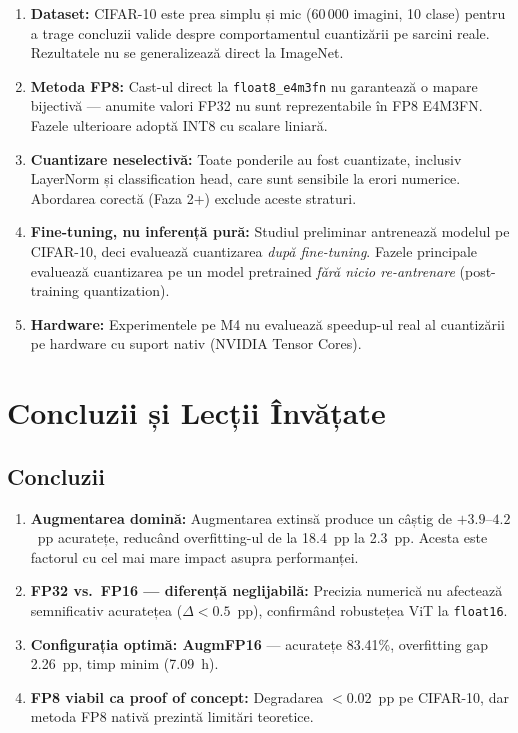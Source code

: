 \documentclass[12pt,a4paper]{article}
\begin{document}
\begin{enumerate}
  \item \textbf{Dataset:} CIFAR-10 este prea simplu și mic (60\,000 imagini,
    10 clase) pentru a trage concluzii valide despre comportamentul cuantizării
    pe sarcini reale. Rezultatele nu se generalizează direct la ImageNet.

  \item \textbf{Metoda FP8:} Cast-ul direct la \texttt{float8\_e4m3fn} nu
    garantează o mapare bijectivă --- anumite valori FP32 nu sunt reprezentabile
    în FP8 E4M3FN. Fazele ulterioare adoptă INT8 cu scalare liniară.

  \item \textbf{Cuantizare neselectivă:} Toate ponderile au fost cuantizate,
    inclusiv LayerNorm și classification head, care sunt sensibile la erori
    numerice. Abordarea corectă (Faza 2+) exclude aceste straturi.

  \item \textbf{Fine-tuning, nu inferență pură:} Studiul preliminar antrenează
    modelul pe CIFAR-10, deci evaluează cuantizarea \emph{după fine-tuning}.
    Fazele principale evaluează cuantizarea pe un model pretrained
    \emph{fără nicio re-antrenare} (post-training quantization).

  \item \textbf{Hardware:} Experimentele pe M4 nu evaluează speedup-ul real
    al cuantizării pe hardware cu suport nativ (NVIDIA Tensor Cores).
\end{enumerate}

\section{Concluzii și Lecții Învățate}

\subsection{Concluzii}

\begin{enumerate}
  \item \textbf{Augmentarea domină:} Augmentarea extinsă produce un câștig de
    $+3.9$--$4.2$~pp acuratețe, reducând overfitting-ul de la 18.4~pp la 2.3~pp.
    Acesta este factorul cu cel mai mare impact asupra performanței.

  \item \textbf{FP32 vs.\ FP16 --- diferență neglijabilă:} Precizia numerică
    nu afectează semnificativ acuratețea ($\Delta < 0.5$~pp), confirmând
    robustețea ViT la \texttt{float16}.

  \item \textbf{Configurația optimă: AugmFP16} --- acuratețe 83.41\%,
    overfitting gap 2.26~pp, timp minim (7.09~h).

  \item \textbf{FP8 viabil ca proof of concept:} Degradarea $<0.02$~pp pe
    CIFAR-10, dar metoda FP8 nativă prezintă limitări teoretice.
\end{enumerate}
\end{document}
